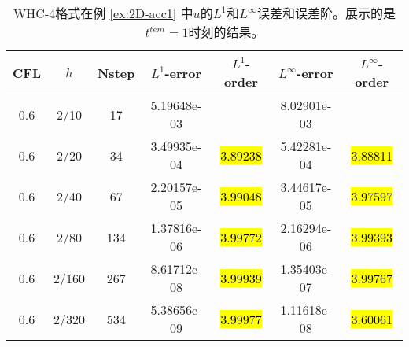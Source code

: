 \def\titleintable{CFL&$h$&Nstep&$L^1$-error&$L^1$-order&$L^\infty$-error&$L^\infty$-order\\}

\begin{table}[htbp]
  \caption{WHC-4格式在例 \ref{ex:2D-acc1} 中$u$的$L^1$和$L^\infty$误差和误差阶。展示的是$t^{tem} = 1$时刻的结果。}
  \label{ta:2D-ex1-WHC4}
  \centering
  \begin{tabular}{ccccccc}
    \toprule
    \titleintable
    \midrule
    0.6 & 2/10  & 17  & 5.19648e-03 &              & 8.02901e-03 &              \\
    0.6 & 2/20  & 34  & 3.49935e-04 & \hl{3.89238} & 5.42281e-04 & \hl{3.88811} \\
    0.6 & 2/40  & 67  & 2.20157e-05 & \hl{3.99048} & 3.44617e-05 & \hl{3.97597} \\
    0.6 & 2/80  & 134 & 1.37816e-06 & \hl{3.99772} & 2.16294e-06 & \hl{3.99393} \\
    0.6 & 2/160 & 267 & 8.61712e-08 & \hl{3.99939} & 1.35403e-07 & \hl{3.99767} \\
    0.6 & 2/320 & 534 & 5.38656e-09 & \hl{3.99977} & 1.11618e-08 & \hl{3.60061} \\
    \bottomrule
  \end{tabular}
\end{table}

